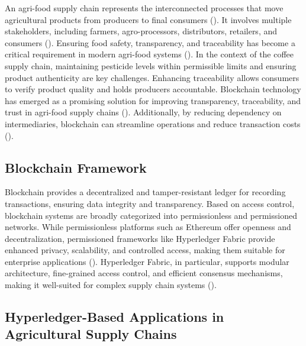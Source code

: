 \documentclass[12pt]{article}
\begin{document}
	An agri-food supply chain represents the interconnected processes that move agricultural products from producers to final consumers (\citet{weerabahu_challenges_2022}). It involves multiple stakeholders, including farmers, agro-processors, distributors, retailers, and consumers (\citet{nayal_antecedents_2021}). Ensuring food safety, transparency, and traceability has become a critical requirement in modern agri-food systems (\citet{hidayati_sustainable_2021}). In the context of the coffee supply chain, maintaining pesticide levels within permissible limits and ensuring product authenticity are key challenges. Enhancing traceability allows consumers to verify product quality and holds producers accountable. Blockchain technology has emerged as a promising solution for improving transparency, traceability, and trust in agri-food supply chains (\citet{zhao_blockchain_2019,shahid_blockchain-based_2020}). Additionally, by reducing dependency on intermediaries, blockchain can streamline operations and reduce transaction costs (\citet{teoh_blockchain_2022}).
	
	\subsection{Blockchain Framework}
	
	Blockchain provides a decentralized and tamper-resistant ledger for recording transactions, ensuring data integrity and transparency. Based on access control, blockchain systems are broadly categorized into permissionless and permissioned networks. While permissionless platforms such as Ethereum offer openness and decentralization, permissioned frameworks like Hyperledger Fabric provide enhanced privacy, scalability, and controlled access, making them suitable for enterprise applications (\citet{crosby_blockchain_2016,namasudra_revolution_2020}). Hyperledger Fabric, in particular, supports modular architecture, fine-grained access control, and efficient consensus mechanisms, making it well-suited for complex supply chain systems (\citet{marchese_agri-food_2021}).
	
	
	
	
	\subsection{Hyperledger-Based Applications in Agricultural Supply Chains}
	
\end{document}
